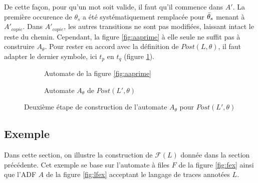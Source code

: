 De cette façon, pour qu'un mot soit valide, il faut qu'il commence dans $A'$. La première occurence de $\theta_s$ a été systématiquement remplacée pour $\bar{\theta}_s$ menant à $A'_{copie}$. Dans $A'_{copie}$, les autres transitions ne sont pas modifiées, laissant intact le reste du chemin. Cependant, la figure \ref{fig:aaprime} à elle seule ne suffit pas à construire $A_\theta$. Pour rester en accord avec la définition de $Post(L,\theta)$, il faut adapter le dernier symbole, ici $t_p$ en $t_q$ (figure \ref{fig:pq}).


\begin{figure}[H]
    \centering
    \begin{subfigure}{0.5\linewidth}
        \centering
        \caption{Automate de la figure \ref{fig:aaprime}}
    \end{subfigure}\hfill
    \begin{subfigure}{0.5\linewidth}
        \centering
        \caption{Automate $A_\theta$ de $Post(L',\theta)$}
    \end{subfigure}
    \caption{Deuxième étape de construction de l'automate $A_\theta$ pour $Post(L',\theta)$}\label{fig:pq}
\end{figure}



\subsection{Exemple}

Dans cette section, on illustre la construction de $\mathcal{F}(L)$ donnée dans la section précédente. Cet exemple se base sur l'automate à files $F$ de la figure \ref{fig:fex} ainsi que l'ADF $A$ de la figure \ref{fig:lfex} acceptant le langage de traces annotées $L$.

